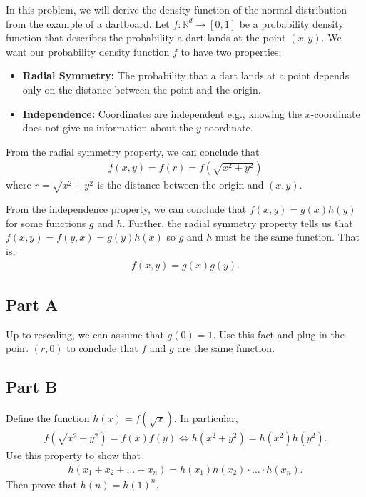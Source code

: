 \documentclass{article}
\begin{document}
In this problem, we will derive the density function of the normal distribution from the example of a dartboard. Let \(f: \mathbb{R}^d \to [0,1]\) be a probability density function that describes the probability a dart lands at the point \((x,y)\). We want our probability density function \(f\) to have two properties:

\begin{itemize}
\item
  \textbf{Radial Symmetry:} The probability that a dart lands at a point depends only on the distance between the point and the origin.
\item
  \textbf{Independence:} Coordinates are independent e.g., knowing the \(x\)-coordinate does not give us information about the \(y\)-coordinate.
\end{itemize}

From the radial symmetry property, we can conclude that \begin{align*}
f(x,y) = f(r) = f(\sqrt{x^2 + y^2})
\end{align*} where \(r=\sqrt{x^2+y^2}\) is the distance between the origin and \((x,y)\).

From the independence property, we can conclude that \(f(x,y) = g(x) h(y)\) for some functions \(g\) and \(h\). Further, the radial symmetry property tells us that \(f(x,y) = f(y,x) = g(y) h(x)\) so \(g\) and \(h\) must be the same function. That is, \begin{align*}
f(x,y) = g(x) g(y).
\end{align*}

\hypertarget{part-a}{%
\subsection*{Part A}\label{part-a}}

Up to rescaling, we can assume that \(g(0)=1\). Use this fact and plug in the point \((r,0)\) to conclude that \(f\) and \(g\) are the same function.

\hypertarget{part-b}{%
\subsection*{Part B}\label{part-b}}

Define the function \(h(x) = f(\sqrt{x})\). In particular, \begin{align*}
f(\sqrt{x^2 + y^2}) = f(x) f(y) \Leftrightarrow
h(x^2 + y^2) = h(x^2) h(y^2).
\end{align*} Use this property to show that \begin{align*}
h(x_1 + x_2 + \ldots + x_n) = h(x_1) h(x_2) \cdot \ldots \cdot h(x_n).
\end{align*} Then prove that \(h(n) = h(1)^n\).
\end{document}
